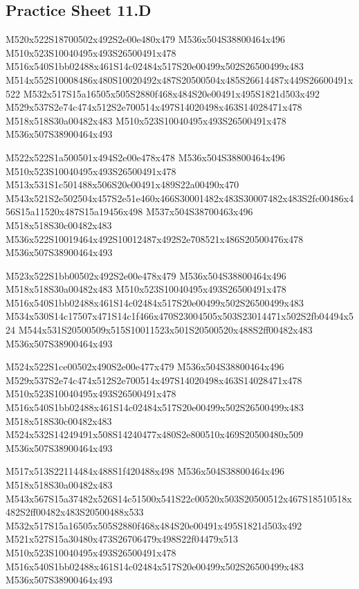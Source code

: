 \documentclass{article}
\begin{document}
\subsection{Practice Sheet 11.D}

\begin{multicols}{5}
\begin{center}

M520x522S18700502x492S2e00e480x479 %
M536x504S38800464x496 %
M510x523S10040495x493S26500491x478 %
M516x540S1bb02488x461S14c02484x517S20e00499x502S26500499x483 %
M514x552S10008486x480S10020492x487S20500504x485S26614487x449S26600491x522 %
M532x517S15a16505x505S2880f468x484S20e00491x495S1821d503x492 %
M529x537S2e74c474x512S2e700514x497S14020498x463S14028471x478 %
M518x518S30a00482x483 %
M510x523S10040495x493S26500491x478 %
M536x507S38900464x493 %
\vfil
\columnbreak

M522x522S1a500501x494S2e00e478x478 %
M536x504S38800464x496 %
M510x523S10040495x493S26500491x478 %
M513x531S1c501488x506S20e00491x489S22a00490x470 %
M543x521S2e502504x457S2e51e460x466S30001482x483S30007482x483S2fc00486x456S15a11520x487S15a19456x498 %
M537x504S38700463x496 %
M518x518S30c00482x483 %
M536x522S10019464x492S10012487x492S2e708521x486S20500476x478 %
M536x507S38900464x493 %
\vfil
\columnbreak

M523x522S1bb00502x492S2e00e478x479 %
M536x504S38800464x496 %
M518x518S30a00482x483 %
M510x523S10040495x493S26500491x478 %
M516x540S1bb02488x461S14c02484x517S20e00499x502S26500499x483 %
M534x530S14c17507x471S14c1f466x470S23004505x503S23014471x502S2fb04494x524 %
M544x531S20500509x515S10011523x501S20500520x488S2ff00482x483 %
M536x507S38900464x493 %
\vfil
\columnbreak

M524x522S1ce00502x490S2e00e477x479 %
M536x504S38800464x496 %
M529x537S2e74c474x512S2e700514x497S14020498x463S14028471x478 %
M510x523S10040495x493S26500491x478 %
M516x540S1bb02488x461S14c02484x517S20e00499x502S26500499x483 %
M518x518S30c00482x483 %
M524x532S14249491x508S14240477x480S2e800510x469S20500480x509 %
M536x507S38900464x493 %
\vfil
\columnbreak

M517x513S22114484x488S1f420488x498 %
M536x504S38800464x496 %
M518x518S30a00482x483 %
M543x567S15a37482x526S14c51500x541S22c00520x503S20500512x467S18510518x482S2ff00482x483S20500488x533 %
M532x517S15a16505x505S2880f468x484S20e00491x495S1821d503x492 %
M521x527S15a30480x473S26706479x498S22f04479x513 %
M510x523S10040495x493S26500491x478 %
M516x540S1bb02488x461S14c02484x517S20e00499x502S26500499x483 %
M536x507S38900464x493 %
\vfil

\end{center}
\end{multicols}
\end{document}
